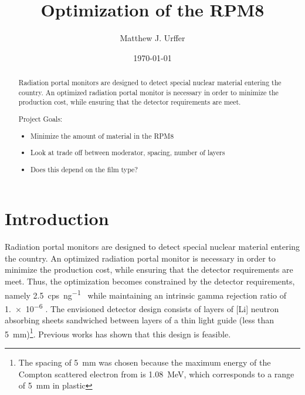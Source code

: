 \documentclass[draftcls,onecolumn]{IEEEtran}
\begin{document}
\title{Optimization of the RPM8}
\author{Matthew J. Urffer}
\date{\today}

\maketitle
\begin{abstract}
Radiation portal monitors are designed to detect special nuclear material entering the country.
An optimized radiation portal monitor is necessary in order to minimize the production cost, while ensuring that the detector requirements are meet.

Project Goals:
\begin{itemize}
	\item Minimize the amount of material in the RPM8
	\item Look at trade off between moderator, spacing, number of layers
	\item Does this depend on the film type?
\end{itemize}
\end{abstract}

\IEEEpeerreviewmaketitle

\pagebreak
\tableofcontents
\listoftodos
\listoffigures
\listoftables
\lstlistoflistings
\pagebreak

\section{Introduction}
Radiation portal monitors are designed to detect special nuclear material entering the country.
An optimized radiation portal monitor is necessary in order to minimize the production cost, while ensuring that the detector requirements are meet.
Thus, the optimization becomes constrained by the detector requirements, namely \SI{2.5}{cps\per\nano\gram{}} while maintaining an intrinsic gamma rejection ratio of \num{1.e-6}  \cite{kouzes_neutron_2010,kouzes_neutron_1999}.
The envisioned detector design consists of layers of [Li] neutron absorbing sheets sandwiched between layers of a thin light guide (less than \SI{5}{\milli \meter})\footnote{The spacing of \SI{5}{\milli \meter} was chosen because the maximum energy of the Compton scattered electron from  is \SI{1.08}{\mega \electronvolt}, which corresponds to a range of \SI{5}{\milli \meter} in plastic}.
Previous works has shown that this design is feasible.
 





\pagebreak
\appendix

\end{document}

